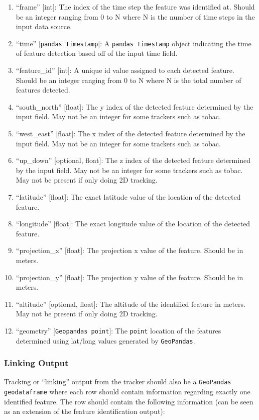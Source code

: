 \documentclass[10pt,a4paper]{article}
\begin{document}
	\begin{enumerate}
		\item “frame” [int]:  The index of the time step the feature was identified at. Should be an integer ranging from 0 to N where N is the number of time steps in the input data source.
		\item “time” [\verb|pandas Timestamp|]: A \verb|pandas Timestamp| object indicating the time of feature detection based off of the input time field.
		\item “feature\_id” [int]: A unique id value assigned to each detected feature. Should be an integer ranging from 0 to N where N is the total number of features detected.
		\item “south\_north” [float]: The y index of the detected feature determined by the input field. May not be an integer for some trackers such as tobac.
		\item “west\_east” [float]:  The x index of the detected feature determined by the input field. May not be an integer for some trackers such as tobac.
		\item “up\_down” [optional, float]: The z index of the detected feature determined by the input field. May not be an integer for some trackers such as tobac. May not be present if only doing 2D tracking.
		\item “latitude” [float]: The exact latitude value of the location of the detected feature.
		\item “longitude” [float]: The exact longitude value of the location of the detected feature.
		\item “projection\_x” [float]: The projection x value of the feature. Should be in meters.
		\item “projection\_y” [float]: The projection y value of the feature. Should be in meters.
		\item “altitude” [optional, float]:  The altitude of the identified feature in meters. May not be present if only doing 2D tracking.
		\item “geometry” [\verb|Geopandas point|]: The \verb|point| location of the features determined using lat/long values generated by \verb|GeoPandas|. 
	\end{enumerate} 
	
	\subsubsection{Linking Output}
	Tracking or “linking” output from the tracker should also be a \verb|GeoPandas geodataframe| where each row should contain information regarding exactly one identified feature. The row should contain the following information (can be seen as an extension of the feature identification output):
	
\end{document}
